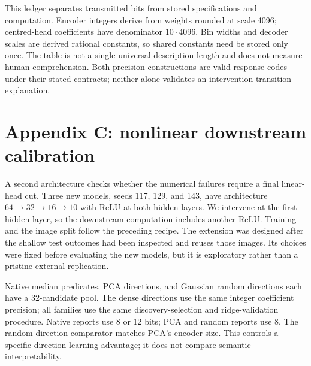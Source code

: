 \documentclass[
  british,
  11pt,
  a4paper,
]{article}
\begin{document}
This ledger separates transmitted bits from stored specifications and
computation. Encoder integers derive from weights rounded at scale 4096;
centred-head coefficients have denominator \(10\cdot4096\). Bin widths
and decoder scales are derived rational constants, so shared constants
need be stored only once. The table is not a single universal
description length and does not measure human comprehension. Both
precision constructions are valid response codes under their stated
contracts; neither alone validates an intervention-transition
explanation.

\section{Appendix C: nonlinear downstream
calibration}\label{appendix-c-nonlinear-downstream-calibration}

A second architecture checks whether the numerical failures require a
final linear-head cut. Three new models, seeds 117, 129, and 143, have
architecture \(64\to32\to16\to10\) with ReLU at both hidden layers. We
intervene at the first hidden layer, so the downstream computation
includes another ReLU. Training and the image split follow the preceding
recipe. The extension was designed after the shallow test outcomes had
been inspected and reuses those images. Its choices were fixed before
evaluating the new models, but it is exploratory rather than a pristine
external replication.

Native median predicates, PCA directions, and Gaussian random directions
each have a 32-candidate pool. The dense directions use the same integer
coefficient precision; all families use the same discovery-selection and
ridge-validation procedure. Native reports use 8 or 12 bits; PCA and
random reports use 8. The random-direction comparator matches PCA's
encoder size. This controls a specific direction-learning advantage; it
does not compare semantic interpretability.
\end{document}
